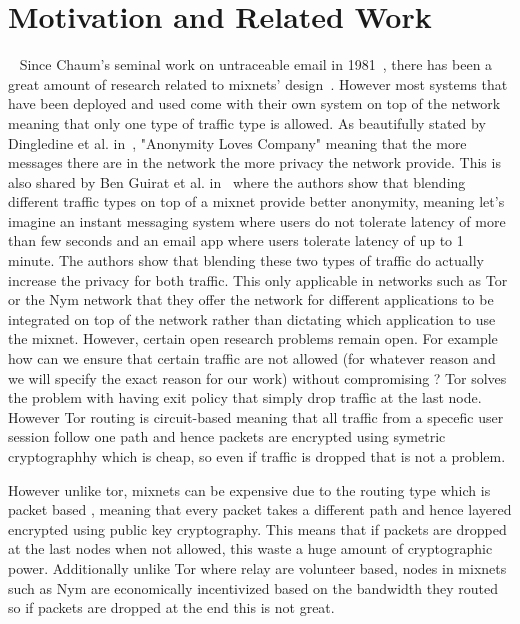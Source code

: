 \section{Motivation and Related Work}~\label{sec:related}
Since Chaum’s seminal work on untraceable email in 1981~\cite{chaum-mix}, there has been a great amount of research related to mixnets' design~\cite{piotrowska2017loopix, van2015vuvuzela, kwon2020xrd, lazar2018karaoke, cottrell1995mixmaster, alexopoulos2017MCMIX, chaum2016cmix, chaum-mix, danezis2003mixminion}. However most systems that have been deployed and used come with their own system on top of the network meaning that only one type of traffic type is allowed. As beautifully stated by Dingledine et al. in~\cite{dingledine2006anonymity}, "Anonymity Loves Company" meaning that the more messages there are in the network the more privacy the network provide. This is also shared by Ben Guirat et al. in~\cite{benguirat2023blending} where the authors show that blending different traffic types on top of a mixnet provide better anonymity, meaning let's imagine an instant messaging system where users do not tolerate latency of more than few seconds and an email app where users tolerate latency of up to 1 minute. The authors show that blending these two types of traffic do actually increase the privacy for both traffic. This only applicable in networks such as Tor or the Nym network that they offer the network for different applications to be integrated on top of the network rather than dictating which application to use the mixnet.
However, certain open research problems remain open. For example how can we ensure that certain traffic are not allowed (for whatever reason and we will specify the exact reason for our work) without compromising ?
Tor solves the problem with having exit policy that simply drop traffic at the last node. However Tor routing is circuit-based meaning that all traffic from a specefic user session follow one path and hence packets are encrypted using symetric cryptographhy which is cheap, so even if traffic is dropped that is not a problem.

However unlike tor, mixnets can be expensive due to the routing type which is packet based , meaning that every packet takes a different path and hence layered encrypted using public key cryptography. This means that if packets are dropped at the last nodes when not allowed, this waste a huge amount of cryptographic power. Additionally unlike Tor where relay are volunteer based, nodes in mixnets such as Nym are economically incentivized based on the bandwidth they routed so if packets are dropped at the end this is not great.
